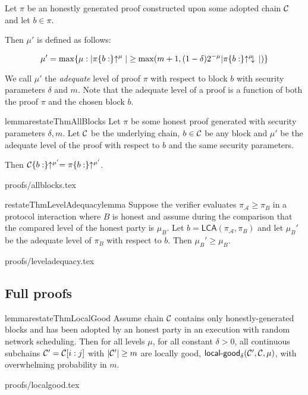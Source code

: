 \begin{definition}
Let $\pi$ be an honestly generated proof constructed upon some adopted chain
$\mathcal{C}$ and let $b \in \pi$.

Then $\mu'$ is defined as follows:

\begin{equation*}
\mu' = \max\{\mu: |\pi\{b:\}\negthickspace\uparrow^\mu| \geq \max(m + 1, (1 -
\delta)2^{-\mu}|\pi\{b:\}\negthickspace\uparrow^\mu\negthickspace\downarrow\,|)\}
\end{equation*}

We call $\mu'$ the \textit{adequate} level of proof $\pi$ with respect to
block $b$ with security parameters $\delta$ and $m$. Note that the adequate
level of a proof is a function of both the proof $\pi$ and the chosen block $b$.
\end{definition}

\begin{restatable}{lemma}{restateThmAllBlocks}\label{lem.allblocks}
Let $\pi$ be some honest proof generated with security parameters $\delta, m$.
Let $\mathcal{C}$ be the underlying chain, $b \in \mathcal{C}$ be any block and $\mu'$ be
the adequate level of the proof with respect to $b$ and the same security
parameters.

Then $\mathcal{C}\{b:\}\negthickspace\uparrow^{\mu'} = \pi\{b:\}\negthickspace\uparrow^{\mu'}$.
\end{restatable}
\ifonecolumn
{proofs/allblocks.tex}
\fi

\begin{restatable}{restateThmLevelAdequacy}{lemma}
Suppose the verifier evaluates $\pi_\mathcal{A} \geq \pi_B$ in a protocol
interaction where $B$ is honest and assume during the comparison that the
compared level of the honest party is $\mu_B$. Let $b =
\textsf{LCA}(\pi_\mathcal{A}, \pi_B)$ and let $\mu_B'$ be the adequate
level of $\pi_B$ with respect to $b$. Then $\mu_B' \geq \mu_B$.
\end{restatable}
\ifonecolumn
{proofs/leveladequacy.tex}
\fi


\subsection{Full proofs}
\label{sec.proofs}


\begin{restatable}{lemma}{restateThmLocalGood}
\label{lem.localgood}
Assume chain $\mathcal{C}$ contains only honestly-generated blocks and has been
adopted by an honest party in an execution with random network scheduling. Then
for all levels $\mu$, for all constant $\delta > 0$, all continuous subchains
$\mathcal{C}' = \mathcal{C}[i:j]$ with $|\mathcal{C}'| \geq m$ are locally good,
$\textsf{local-good}_{\delta}(\mathcal{C}', \mathcal{C}, \mu)$, with overwhelming
probability in $m$.
\end{restatable}
{proofs/localgood.tex}

